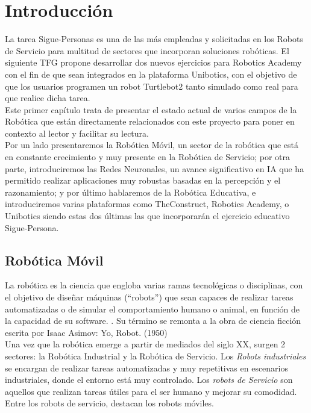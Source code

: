 \chapter{Introducción}
\label{cap:capitulo1}
\setcounter{page}{1}
\pagestyle{plain}

La tarea Sigue-Personas es una de las más empleadas y solicitadas en los Robots de Servicio para multitud de sectores que incorporan soluciones robóticas. El siguiente TFG propone desarrollar dos nuevos ejercicios para Robotics Academy con el fin de que sean integrados en la plataforma Unibotics, con el objetivo de que los usuarios programen un robot Turtlebot2 tanto simulado como real para que realice dicha tarea.\\

Este primer capítulo trata de presentar el estado actual de varios campos de la Robótica que están directamente relacionados con este proyecto para poner en contexto al lector y facilitar su lectura.\\

Por un lado presentaremos la Robótica Móvil, un sector de la robótica que está en constante crecimiento y muy presente en la Robótica de Servicio; por otra parte, introduciremos las Redes Neuronales, un avance significativo en IA que ha permitido realizar aplicaciones muy robustas basadas en la percepción y el razonamiento; y por último hablaremos de la Robótica Educativa, e introduciremos varias plataformas como TheConstruct, Robotics Academy, o Unibotics siendo estas dos últimas las que incorporarán el ejercicio educativo Sigue-Persona.




\section{Robótica Móvil}
\label{sec:robotica_movil}

La robótica es la ciencia que engloba varias ramas tecnológicas o disciplinas, con el objetivo de diseñar máquinas (``robots'') que sean capaces de realizar tareas automatizadas o de simular el comportamiento humano o animal, en función de la capacidad de su software. \cite{revistaderobots}. Su término se remonta a la obra de ciencia ficción escrita por Isaac Asimov: Yo, Robot. (1950)\\

Una vez que la robótica emerge a partir de mediados del siglo XX, surgen 2 sectores: la Robótica Industrial y la Robótica de Servicio. Los \textit{Robots industriales} se encargan de realizar tareas automatizadas y muy repetitivas en escenarios industriales, donde el entorno está muy controlado. Los \textit{robots de Servicio} son aquellos que realizan tareas útiles para el ser humano y mejorar su comodidad. Entre los robots de servicio, destacan los robots móviles.\\

